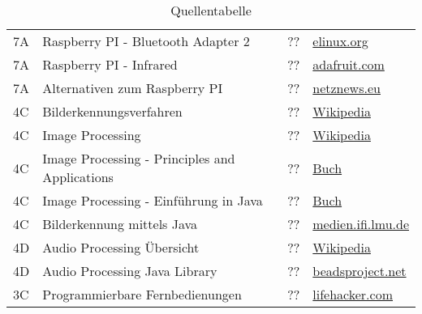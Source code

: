 \begin{table}[h!]
\begin{tabular}{l l l l}
        7A & Raspberry PI - Bluetooth Adapter 2 & ?? & \href{http://elinux.org/RPi_USB_Bluetooth_adapters}{elinux.org} \\
        
        7A & Raspberry PI - Infrared & ?? & \href{https://learn.adafruit.com/using-an-ir-remote-with-a-raspberry-pi-media-center/overview}{adafruit.com} \\
        
        7A & Alternativen zum Raspberry PI & ?? &
        \href{http://www.netznews.eu/10-raspberry-pi-alternativen-im-kurzportraet/}{netznews.eu} \\
        
        4C & Bilderkennungsverfahren & ?? & \href{http://en.wikipedia.org/wiki/Outline_of_object_recognition}{Wikipedia} \\
        
        4C & Image Processing & ?? & \href{http://en.wikipedia.org/wiki/Image_processing}{Wikipedia} \\
        
        4C & Image Processing - Principles and Applications & ?? & \href{http://books.google.co.in/books?id=smBw4-xvfrIC&lpg=PP1&dq=image\%20processing\%20ajoy\%20ray&pg=PP1#v=onepage&q=&f=false}{Buch} \\
        
        4C & Image Processing - Einführung in Java & ?? & \href{ http://imagingbook.com/}{Buch} \\
      
        4C & Bilderkennung mittels Java & ?? & \href{https://www.medien.ifi.lmu.de/lehre/ss07/mt/mtB3b.pdf}{medien.ifi.lmu.de} \\

        4D & Audio Processing Übersicht & ?? & \href{http://en.wikipedia.org/wiki/Audio_signal_processing}{Wikipedia} \\
        
        4D & Audio Processing Java Library & ?? & \href{http://www.beadsproject.net/}{beadsproject.net} \\
        
        3C & Programmierbare Fernbedienungen & ?? & \href{http://lifehacker.com/5901930/five-best-universal-remote-controls}{lifehacker.com} \\
        
	\end{tabular}
	\caption{Quellentabelle}
	\label{tab:quelle}
\end{table}
